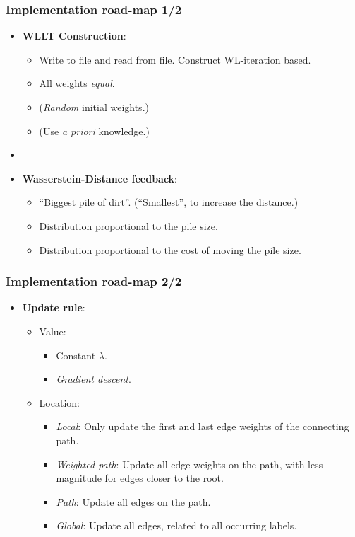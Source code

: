 \begin{frame}[noframenumbering]
\frametitle{Implementation road-map 1/2}
\begin{itemize}
	\item \textbf{WLLT Construction}:
		\begin{itemize}
			\item Write to file and read from file. Construct WL-iteration based.
			\item All weights \textit{equal}.
			\item (\textit{Random} initial weights.)
			\item (Use \textit{a priori} knowledge.)
		\end{itemize}
	\item[]
	\item \textbf{Wasserstein-Distance feedback}:
		\begin{itemize}
			\item \enquote{Biggest pile of dirt}. 
			(\enquote{Smallest}, to increase the distance.)
			\item Distribution proportional to the pile size.
			\item Distribution proportional to the cost of moving the pile size.
		\end{itemize}	
\end{itemize}	
\end{frame}

\begin{frame}[noframenumbering]
\frametitle{Implementation road-map 2/2}
\begin{itemize}
	\item \textbf{Update rule}:
	\begin{itemize}
		\item Value:
		\begin{itemize}
			\item Constant $\lambda$.
			\item \textit{Gradient descent}.
		\end{itemize}
		\item Location:
		\begin{itemize}
			\item \textit{Local}: Only update the first and last edge weights of the connecting path.
			\item \textit{Weighted path}: Update all edge weights on the path, with less magnitude for edges closer to the root.
			\item \textit{Path}: Update all edges on the path.
			\item \textit{Global}: Update all edges, related to all occurring labels.
		\end{itemize}
	\end{itemize}		
\end{itemize}	
\end{frame}


